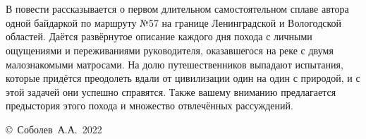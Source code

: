 \chapter*{}
В повести рассказывается о первом длительном самостоятельном сплаве автора одной байдаркой по маршруту №57 на границе Ленинградской и Вологодской областей. Даётся развёрнутое описание каждого дня похода с личными ощущениями и переживаниями руководителя, оказавшегося на реке с двумя малознакомыми матросами. На долю путешественников выпадают испытания, которые придётся преодолеть вдали от цивилизации один на один с природой, и с этой задачей они успешно справятся. Также вашему вниманию предлагается предыстория этого похода и множество отвлечённых рассуждений.
\vspace{\fill}
\begin{flushright}
	\copyright~Соболев~А.А.~2022
\end{flushright}